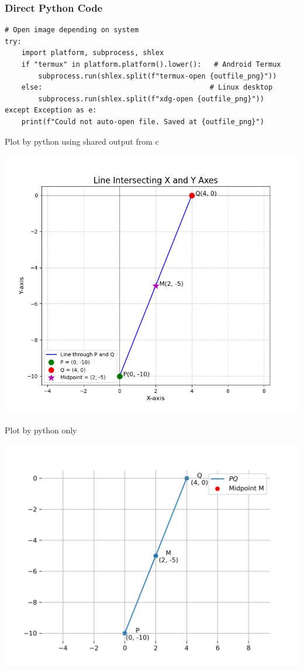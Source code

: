 \documentclass{beamer}
\begin{document}
\begin{frame}[fragile]
	\frametitle{Direct Python Code}
	\begin{lstlisting}
# Open image depending on system
try:
    import platform, subprocess, shlex
    if "termux" in platform.platform().lower():   # Android Termux
        subprocess.run(shlex.split(f"termux-open {outfile_png}"))
    else:                                        # Linux desktop
        subprocess.run(shlex.split(f"xdg-open {outfile_png}"))
except Exception as e:
    print(f"Could not auto-open file. Saved at {outfile_png}")
\end{lstlisting}
\end{frame}
\begin{frame}{Plot by python using shared output from c}
	\begin{center}
		\includegraphics[width=0.8\columnwidth]{figs/Figure_1.png}
	\end{center}
\end{frame}

\begin{frame}{Plot by python only}
	\begin{center}
		\includegraphics[width=0.9\columnwidth]{figs/fig.png}
	\end{center}
\end{frame}
\end{document}
